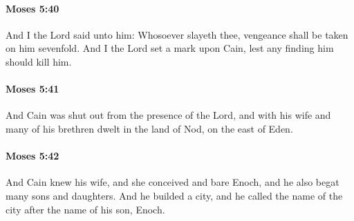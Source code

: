 		\paragraph{Moses 5:40} %
			\label{MOSES-5-40}

			And I the Lord said unto him: Whosoever slayeth thee, vengeance shall be taken on him sevenfold. And I the Lord set a mark upon Cain, lest any finding him should kill him.


		\paragraph{Moses 5:41} %
			\label{MOSES-5-41}

			And Cain was shut out from the presence of the Lord, and with his wife and many of his brethren dwelt in the land of Nod, on the east of Eden.


		\paragraph{Moses 5:42} %
			\label{MOSES-5-42}

			And Cain knew his wife, and she conceived and bare Enoch, and he also begat many sons and daughters. And he builded a city, and he called the name of the city after the name of his son, Enoch.


